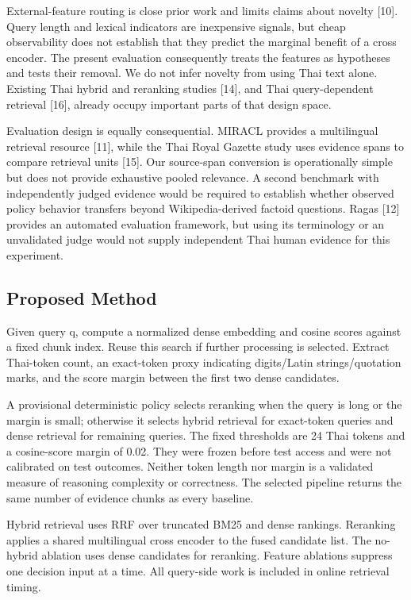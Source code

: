 \documentclass[10pt,a4paper]{article}
\begin{document}
External-feature routing is close prior work and limits claims about
novelty [10]. Query length and lexical indicators are
inexpensive signals, but cheap observability does not establish that
they predict the marginal benefit of a cross encoder. The present
evaluation consequently treats the features as hypotheses and tests
their removal. We do not infer novelty from using Thai text alone.
Existing Thai hybrid and reranking studies [14], and Thai
query-dependent retrieval [16], already occupy important parts
of that design space.

Evaluation design is equally consequential. MIRACL provides a
multilingual retrieval resource [11], while the Thai Royal
Gazette study uses evidence spans to compare retrieval units
[15]. Our source-span conversion is operationally simple but
does not provide exhaustive pooled relevance. A second benchmark with
independently judged evidence would be required to establish whether
observed policy behavior transfers beyond Wikipedia-derived factoid
questions. Ragas [12] provides an automated evaluation
framework, but using its terminology or an unvalidated judge would not
supply independent Thai human evidence for this experiment.

\hypertarget{proposed-method}{%
\subsection{Proposed Method}\label{proposed-method}}

Given query q, compute a normalized dense embedding and cosine scores
against a fixed chunk index. Reuse this search if further processing is
selected. Extract Thai-token count, an exact-token proxy indicating
digits/Latin strings/quotation marks, and the score margin between the
first two dense candidates.

A provisional deterministic policy selects reranking when the query is
long or the margin is small; otherwise it selects hybrid retrieval for
exact-token queries and dense retrieval for remaining queries. The fixed
thresholds are 24 Thai tokens and a cosine-score margin of 0.02. They
were frozen before test access and were not calibrated on test outcomes.
Neither token length nor margin is a validated measure of reasoning
complexity or correctness. The selected pipeline returns the same number
of evidence chunks as every baseline.

Hybrid retrieval uses RRF over truncated BM25 and dense rankings.
Reranking applies a shared multilingual cross encoder to the fused
candidate list. The no-hybrid ablation uses dense candidates for
reranking. Feature ablations suppress one decision input at a time. All
query-side work is included in online retrieval timing.
\end{document}

